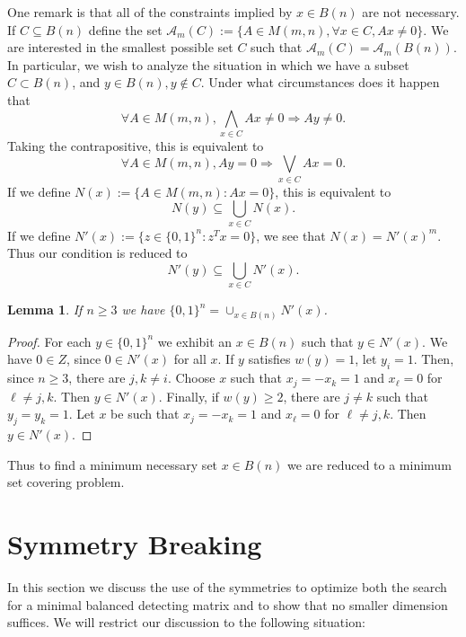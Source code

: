 \documentclass{article}
\newcommand{\cA}{\mathcal{A}}
\newtheorem{lemma}{Lemma}
\begin{document}
One remark is that all of the constraints implied by $x \in B(n)$ are
not necessary.  If $C \subseteq B(n)$ define the set
$\cA_m(C) := \{A \in M(m,n), \forall x \in C, Ax \ne 0\}$.  We are
interested in the smallest possible set $C$ such that $\cA_m(C) = \cA_m(B(n))$.
In particular, we wish to analyze the situation in
which we have a subset $C \subset B(n)$, and $y \in B(n), y \not \in
C$.  Under what circumstances does it happen that
\begin{displaymath}
  \forall A \in M(m,n), \bigwedge_{x \in C} Ax \ne 0 \Rightarrow Ay
  \ne 0.
\end{displaymath}
Taking the contrapositive, this is equivalent to
\begin{displaymath}
  \forall A \in M(m,n), Ay = 0 \Rightarrow \bigvee_{x \in C} Ax = 0.
\end{displaymath}
If we define $N(x) := \{A \in M(m,n): A x = 0\}$, this is equivalent
to
\begin{displaymath}
  N(y) \subseteq \bigcup_{x \in C} N(x).
\end{displaymath}
If we define $N'(x) := \{z \in \{0,1\}^n : z^T x = 0\}$, we see that
$N(x) = N'(x)^m$.  Thus our condition is reduced to
\begin{displaymath}
  N'(y) \subseteq \bigcup_{x \in C} N'(x).
\end{displaymath}
\begin{lemma}
If $n \ge 3$ we have $\{0,1\}^n = \cup_{x \in B(n)} N'(x)$.
\end{lemma}
\begin{proof}
  For each $y \in \{0,1\}^n$ we exhibit an $x \in B(n)$ such that $y
  \in N'(x)$.
  We have  $0 \in Z$, since $0 \in N'(x)$ for all $x$.  If
  $y$ satisfies $w(y) = 1$, let $y_i = 1$. Then, since
  $n \ge 3$, there are $j,k \ne i$.  Choose $x$ such that $x_j = - x_k = 1$ and
  $x_\ell = 0$ for $\ell \ne j,k$. Then $y \in N'(x)$.  Finally, if
  $w(y) \ge 2$, there are $j \ne k$ such that $y_j = y_k = 1$.  Let
  $x$ be such that $x_j = -x_k = 1$ and $x_\ell = 0$ for
  $\ell \ne j,k$. Then $y \in N'(x)$.
\end{proof}
Thus to find a minimum necessary set $x \in B(n)$ we are reduced to a
minimum set covering problem.

\section{Symmetry Breaking}
\label{sec:symmetry}

In this section we discuss the use of the symmetries to optimize both
the search for a minimal balanced detecting matrix and to show that no
smaller dimension suffices.  We will restrict our discussion to the
following situation:
\end{document}
